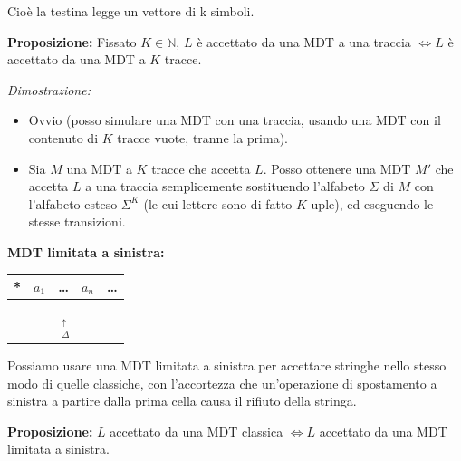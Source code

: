 Cioè la testina legge un vettore di k simboli.

\vspace{0.4cm}

\textbf{Proposizione:} Fissato $K \in \mathbb{N}$, $L$ è accettato da una MDT a una traccia $\iff L$ è accettato da una MDT a $K$ tracce.

\textit{Dimostrazione:}
\begin{itemize}
    \item[$\implies$)] Ovvio (posso simulare una MDT con una traccia, usando una MDT con il contenuto di $K$ tracce vuote, tranne la prima).
    \item[$\impliedby$)] Sia $M$ una MDT a $K$ tracce che accetta $L$. 
    Posso ottenere una MDT $M'$ che accetta $L$ a una traccia semplicemente sostituendo l'alfabeto $\Sigma$ di $M$ con l'alfabeto esteso $\Sigma^K$ (le cui lettere sono di fatto $K$-uple), ed eseguendo le stesse transizioni.
\end{itemize}

\newpage
\textbf{MDT limitata a sinistra:}
\begin{center}
\begin{tabular}{|c|c|c|c|c|}
\hline
* & $a_1$ & \dots & $a_n$ & \dots \\
\hline
\multicolumn{5}{c}{$\underset{\substack{\uparrow \\ \Delta}}{\phantom{*}}$} \\
\end{tabular}
\end{center}

Possiamo usare una MDT limitata a sinistra per accettare stringhe nello stesso modo di quelle classiche, con l'accortezza che un'operazione di spostamento a sinistra a partire dalla prima cella causa il rifiuto della stringa.

\vspace{0.6cm}
\textbf{Proposizione:} $L$ accettato da una MDT classica $\iff L$ accettato da una MDT limitata a sinistra.


